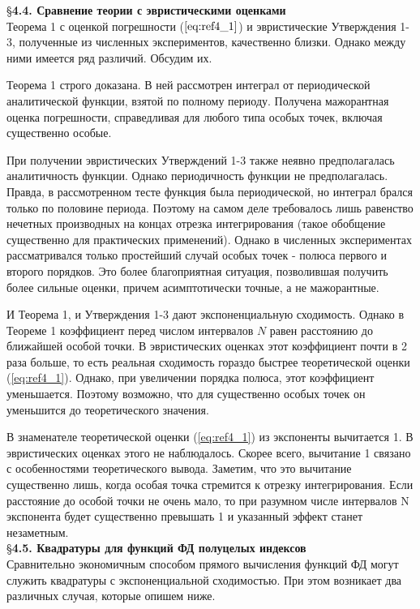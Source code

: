 \S \textbf{4.4. Сравнение теории с эвристическими оценками}
\\

Теорема 1 с оценкой погрешности ($\ref{eq:ref4_1}$) и эвристические Утверждения 1-3, полученные из численных экспериментов, качественно близки. Однако между ними имеется ряд различий. Обсудим их.

Теорема 1 строго доказана. В ней рассмотрен интеграл от периодической аналитической функции, взятой по полному периоду. Получена мажорантная оценка погрешности, справедливая для любого типа особых точек, включая существенно особые.

При получении эвристических Утверждений 1-3 также неявно предполагалась аналитичность функции. Однако периодичность функции не предполагалась. Правда, в рассмотренном тесте функция была периодической, но интеграл брался только по половине периода. Поэтому на самом деле требовалось лишь равенство нечетных производных на концах отрезка интегрирования (такое обобщение существенно для практических применений). Однако в численных экспериментах рассматривался только простейший случай особых точек - полюса первого и второго порядков. Это более благоприятная ситуация, позволившая получить более сильные оценки, причем асимптотически точные, а не мажорантные.

И Теорема 1, и Утверждения 1-3 дают экспоненциальную сходимость. Однако в Теореме 1 коэффициент перед числом интервалов $N$ равен расстоянию до ближайшей особой точки. В эвристических оценках этот коэффициент почти в 2 раза больше, то есть реальная сходимость гораздо быстрее теоретической оценки (\ref{eq:ref4_1}). Однако, при увеличении порядка полюса, этот коэффициент уменьшается. Поэтому возможно, что для существенно особых точек он уменьшится до теоретического значения.

В знаменателе теоретической оценки (\ref{eq:ref4_1}) из экспоненты вычитается 1. В эвристических оценках этого не наблюдалось. Скорее всего, вычитание 1 связано с особенностями теоретического вывода. Заметим, что это вычитание существенно лишь, когда особая точка стремится к отрезку интегрирования. Если расстояние до особой точки не очень мало, то при разумном числе интервалов N экспонента будет существенно превышать 1 и указанный эффект станет незаметным.
\\

\S \textbf{4.5. Квадратуры для функций ФД полуцелых индексов}
\\

Сравнительно экономичным способом прямого вычисления функций ФД могут служить квадратуры с
экспоненциальной сходимостью. При этом возникает два различных случая,
которые опишем ниже.

